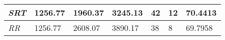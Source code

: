 \documentclass{article}
\begin{document}
\begin{table}[]
\begin{tabular}{|l|l|l|l|l|l|l|}
  \textit{SRT}       & 1256.77                                                                          & 1960.37                                                                     & 3245.13                                                                            & 42                                                                                    & 12                                                                                  & 70.4413                                                                    \\ \hline
  \textit{RR}        & 1256.77                                                                          & 2608.07                                                                     & 3890.17                                                                            & 38                                                                                    & 8                                                                                   & 69.7958                                                                    \\ \hline
  \end{tabular}
  \label{table:13}
\end{table}
\end{document}
